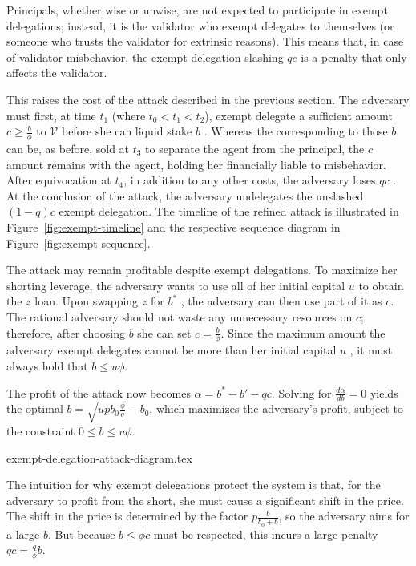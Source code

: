 Principals, whether wise or unwise, are not expected to participate in exempt
delegations; instead, it is the validator who exempt delegates to
themselves (or someone who trusts the validator for extrinsic reasons).
This means that, in case of validator misbehavior, the exempt delegation
slashing $qc$ is a penalty that only affects the validator.

This raises
the cost of the attack described in the previous section. The
adversary must first, at time $t_1$ (where $t_0 < t_1 < t_2$), exempt delegate a sufficient amount
$c \geq \frac{b}{\phi}$ \asset to $\mathcal{V}$ before she can liquid stake $b$ \asset.
Whereas the \stassets
corresponding to those $b$ \assets can be, as before, sold at $t_3$ to
separate the agent from the principal, the $c$ amount remains with the
agent, holding her financially liable to misbehavior. After equivocation at $t_4$,
in addition to any other costs, the adversary loses $qc$ \asset. At the conclusion
of the attack, the adversary undelegates the unslashed $(1 - q)c$ \asset exempt delegation.
The timeline of the refined attack is illustrated in Figure~\ref{fig:exempt-timeline}
and the respective sequence diagram in Figure~\ref{fig:exempt-sequence}.

The attack may remain profitable despite exempt delegations.
To maximize her shorting leverage, the adversary wants to use all
of her initial capital $u$ \asset to obtain the $z$ \stasset loan.
Upon swapping $z$ for $b^*$ \asset, the adversary can then use part of it as $c$.
The rational adversary should not waste any unnecessary resources on
$c$; therefore, after choosing $b$ she can set $c = \frac{b}{\phi}$.
Since the maximum amount the adversary exempt delegates
cannot be more than her initial capital $u$ \asset,
it must always hold that $b \leq u\phi$.

The profit of the attack now becomes $\alpha = b^* - b' - qc$.
Solving for $\frac{d\alpha}{db} = 0$ yields the optimal $b = \sqrt{u p b_0 \frac{\phi}{q}} - b_0$,
which maximizes
the adversary's profit, subject to the constraint
$0 \leq b \leq u\phi$.

\iflncs
  {exempt-delegation-attack-diagram.tex}
\fi

The intuition for why exempt delegations protect the system is that,
for the adversary to profit from the short, she must cause a significant
shift in the price. The shift in the price is determined by the factor
$p\frac{b}{b_0 + b}$, so the adversary aims for a large $b$. But because $b \leq \phi c$
must be respected, this incurs a large penalty $qc = \frac{q}{\phi}b$.


